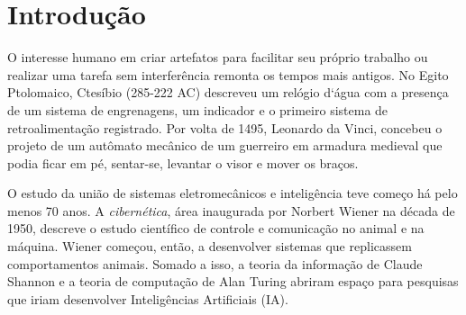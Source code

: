 
\chapter{Introdução}

\label{CapIntro}


\par O interesse humano em criar artefatos para facilitar seu próprio trabalho ou realizar uma tarefa sem interferência remonta os tempos mais antigos. No Egito Ptolomaico, Ctesíbio (285-222 AC) descreveu um relógio d`água com a presença de um sistema de engrenagens, um indicador e o primeiro sistema de retroalimentação registrado. Por volta de 1495, Leonardo da Vinci, concebeu o projeto de um autômato mecânico de um guerreiro em armadura medieval que podia ficar em pé, sentar-se, levantar o visor e mover os braços. \cite{guarnieri2010} 
\par O estudo da união de sistemas eletromecânicos e inteligência teve começo há pelo menos 70 anos. A \textit{cibernética}, área inaugurada por Norbert Wiener na década de 1950, descreve o estudo científico de controle e comunicação no animal e na máquina. Wiener começou, então, a desenvolver sistemas que replicassem comportamentos animais.\cite{wiener1950} Somado a isso, a teoria da informação de Claude Shannon e a teoria de computação de Alan Turing abriram espaço para pesquisas que iriam desenvolver Inteligências Artificiais (IA). \cite{pamela2004} 

